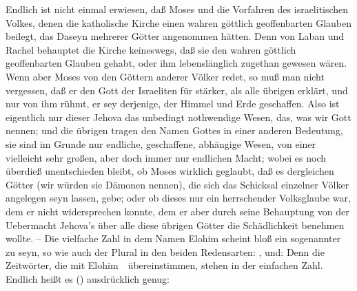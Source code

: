 \begin{aufza}
\item Endlich ist nicht einmal erwiesen, daß Moses und die Vorfahren des israelitischen Volkes, denen die katholische Kirche einen wahren göttlich geoffenbarten Glauben beilegt, das Daseyn mehrerer Götter angenommen hätten. Denn von Laban und Rachel behauptet die Kirche keineswegs, daß sie den wahren göttlich geoffenbarten Glauben gehabt, oder ihm lebenslänglich zugethan gewesen wären. Wenn aber Moses von den Göttern anderer Völker redet, so muß man nicht vergessen, daß er den Gott der Israeliten für stärker, als alle übrigen erklärt, und nur von ihm rühmt, er sey derjenige, der Himmel und Erde geschaffen. Also ist eigentlich nur dieser Jehova das unbedingt nothwendige Wesen, das, was wir Gott nennen; und die übrigen tragen den Namen Gottes in einer anderen Bedeutung, sie sind im Grunde nur endliche, geschaffene, abhängige Wesen, von einer vielleicht sehr großen, aber doch immer nur endlichen Macht; wobei es noch überdieß unentschieden bleibt, ob Moses wirklich geglaubt, daß es dergleichen Götter (wir würden sie Dämonen nennen), die sich das Schicksal einzelner Völker angelegen seyn lassen, gebe; oder ob dieses nur ein herrschender Volksglaube war, dem er nicht widersprechen konnte, dem er aber durch seine Behauptung von der Uebermacht Jehova's über alle diese übrigen Götter die Schädlichkeit benehmen wollte. -- Die vielfache Zahl in dem Namen Elohim scheint bloß ein sogenannter  zu seyn, so wie auch der Plural in den beiden Redensarten: , und:  Denn die Zeitwörter, die mit Elohim~\ übereinstimmen, stehen in der einfachen Zahl. Endlich heißt es () ausdrücklich genug: 
\end{aufza}

